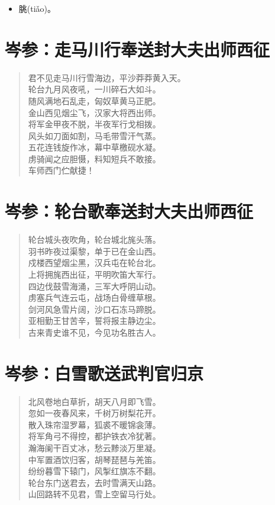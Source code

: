 \documentclass[12pt,oneside]{book}
\newenvironment{shici}{%
\begin{verse}\centering\yanti\large\hspace{12pt}}{\end{verse}}
\begin{document}
\begin{common-format}
\begin{itemize}
\item 朓(tiǎo)。
\end{itemize}


\chapter{岑参：走马川行奉送封大夫出师西征}
\begin{shici}
君不见走马川行雪海边，平沙莽莽黄入天。\\
轮台九月风夜吼，一川碎石大如斗。\\
随风满地石乱走，匈奴草黄马正肥。\\
金山西见烟尘飞，汉家大将西出师。\\
将军金甲夜不脱，半夜军行戈相拨。\\
风头如刀面如割，马毛带雪汗气蒸。\\
五花连钱旋作冰，幕中草檄砚水凝。\\
虏骑闻之应胆慑，料知短兵不敢接。\\
车师西门伫献捷！
\end{shici}

\chapter{岑参：轮台歌奉送封大夫出师西征}
\begin{shici}
轮台城头夜吹角，轮台城北旄头落。\\
羽书昨夜过渠黎，单于已在金山西。\\
戍楼西望烟尘黑，汉兵屯在轮台北。\\
上将拥旄西出征，平明吹笛大军行。\\
四边伐鼓雪海涌，三军大呼阴山动。\\
虏塞兵气连云屯，战场白骨缠草根。\\
剑河风急雪片阔，沙口石冻马蹄脱。\\
亚相勤王甘苦辛，誓将报主静边尘。\\
古来青史谁不见，今见功名胜古人。
\end{shici}

\chapter{岑参：白雪歌送武判官归京}
\begin{shici}
北风卷地白草折，胡天八月即飞雪。\\
忽如一夜春风来，千树万树梨花开。\\
散入珠帘湿罗幕，狐裘不暖锦衾薄。\\
将军角弓不得控，都护铁衣冷犹著。\\
瀚海阑干百丈冰，愁云黪淡万里凝。\\
中军置酒饮归客，胡琴琵琶与羌笛。\\
纷纷暮雪下辕门，风掣红旗冻不翻。\\
轮台东门送君去，去时雪满天山路。\\
山回路转不见君，雪上空留马行处。
\end{shici}


\end{common-format}
\end{document}
